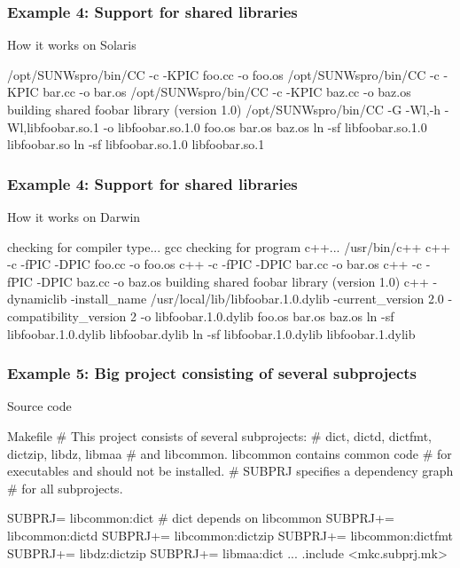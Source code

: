 \documentclass[hyperref={colorlinks=true}]{beamer}
\begin{document}
\begin{frame}[fragile]
  \frametitle{Example 4: Support for shared libraries}

  \begin{block}{How it works on Solaris}
\begin{CodeNoLabel}
/opt/SUNWspro/bin/CC    -c -KPIC foo.cc -o foo.os
/opt/SUNWspro/bin/CC    -c -KPIC bar.cc -o bar.os
/opt/SUNWspro/bin/CC    -c -KPIC baz.cc -o baz.os
building shared foobar library (version 1.0)
/opt/SUNWspro/bin/CC -G -Wl,-h -Wl,libfoobar.so.1 
   -o libfoobar.so.1.0  foo.os bar.os baz.os
ln -sf libfoobar.so.1.0 libfoobar.so
ln -sf libfoobar.so.1.0 libfoobar.so.1
\prompt{\$}
\end{CodeNoLabel}
  \end{block}
\end{frame}

\begin{frame}[fragile]
  \frametitle{Example 4: Support for shared libraries}

  \begin{block}{How it works on Darwin}
\begin{CodeNoLabel}
checking for compiler type... gcc
checking for program c++... /usr/bin/c++
c++    -c -fPIC -DPIC foo.cc -o foo.os
c++    -c -fPIC -DPIC bar.cc -o bar.os
c++    -c -fPIC -DPIC baz.cc -o baz.os
building shared foobar library (version 1.0)
c++ -dynamiclib -install_name 
   /usr/local/lib/libfoobar.1.0.dylib 
   -current_version 2.0 -compatibility_version 2 
   -o libfoobar.1.0.dylib  foo.os bar.os baz.os
ln -sf libfoobar.1.0.dylib libfoobar.dylib
ln -sf libfoobar.1.0.dylib libfoobar.1.dylib
\prompt{\$}
\end{CodeNoLabel}
  \end{block}
\end{frame}

\begin{frame}[fragile]
  \frametitle{Example 5: Big project consisting of several subprojects}

  \begin{block}{Source code}
  \begin{Code}{Makefile}
# This project consists of several subprojects:
# dict, dictd, dictfmt, dictzip, libdz, libmaa
# and libcommon. libcommon contains common code
# for executables and should not be installed.
# SUBPRJ specifies a dependency graph
# for all subprojects.

SUBPRJ=   libcommon:dict   # dict depends on libcommon
SUBPRJ+=  libcommon:dictd
SUBPRJ+=  libcommon:dictzip
SUBPRJ+=  libcommon:dictfmt
SUBPRJ+=  libdz:dictzip
SUBPRJ+=  libmaa:dict
...
.include <mkc.subprj.mk>
  \end{Code}
  \end{block}
\end{frame}
\end{document}
